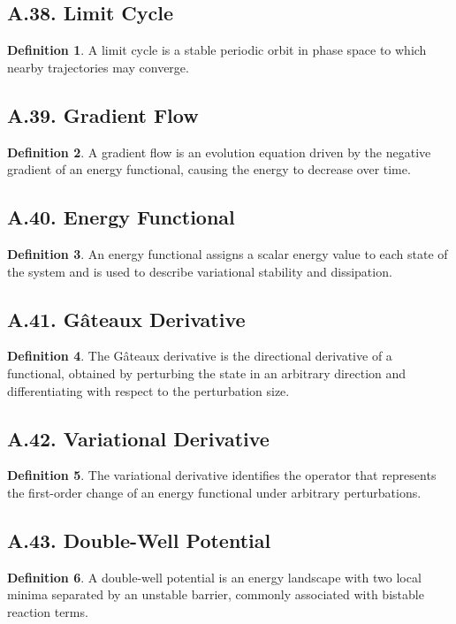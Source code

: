 \documentclass[11pt]{article}
\theoremstyle{definition}
\newtheorem{definition}{Definition}
\theoremstyle{remark}
\begin{document}
\subsection*{A.38. Limit Cycle}
\begin{definition}
A limit cycle is a stable periodic orbit in phase space to which nearby trajectories may converge.
\end{definition}

\subsection*{A.39. Gradient Flow}
\begin{definition}
A gradient flow is an evolution equation driven by the negative gradient of an energy functional, causing the energy to decrease over time.
\end{definition}

\subsection*{A.40. Energy Functional}
\begin{definition}
An energy functional assigns a scalar energy value to each state of the system and is used to describe variational stability and dissipation.
\end{definition}

\subsection*{A.41. G\^ateaux Derivative}
\begin{definition}
The G\^ateaux derivative is the directional derivative of a functional, obtained by perturbing the state in an arbitrary direction and differentiating with respect to the perturbation size.
\end{definition}

\subsection*{A.42. Variational Derivative}
\begin{definition}
The variational derivative identifies the operator that represents the first-order change of an energy functional under arbitrary perturbations.
\end{definition}

\subsection*{A.43. Double-Well Potential}
\begin{definition}
A double-well potential is an energy landscape with two local minima separated by an unstable barrier, commonly associated with bistable reaction terms.
\end{definition}
\end{document}
